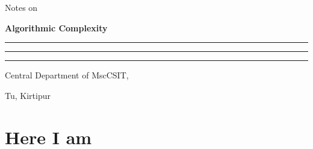 \documentclass{book}
\begin{document}
 	
 	\thispagestyle{empty}
 	\setcounter{page}{0}
 	
 	\mbox{}
 	
 	\vfill
 \begin{center}
 	\large Notes on
 	
 	\LARGE\bfseries Algorithmic Complexity
 	
 	\bigskip\bigskip
 	
 	\rule[-3cm]{.4pt}{6cm}\quad
 	\rule[-4cm]{.4pt}{8cm}\quad
 	\rule[-3cm]{.4pt}{6cm}
 	
 	\bigskip\bigskip
 	
 	\large\mdseries Central Department of MscCSIT,
 	
 	Tu, Kirtipur
 \end{center}
 
 \vfill
 
 \mbox{}
 
 \clearpage
 
 
 
 \newpage
 \pagestyle{plain}
 \SetBgContents{}
 \chapter{Here I am}
 
\end{document}
